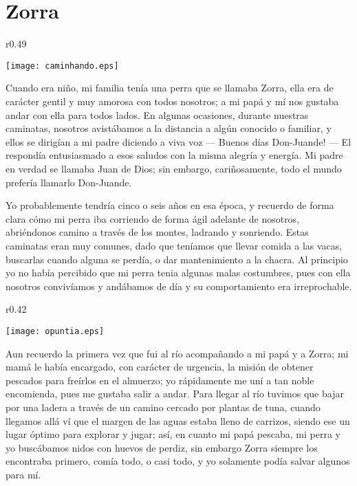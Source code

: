 \cleardoublepage
\newpage
{}
\chapter{Zorra}


\begin{wrapfigure}{r}{0.49\textwidth}
  \begin{center}
  \vspace{-30pt}
    \texttt{[image: caminhando.eps]}
  \end{center}
  \vspace{-20pt}
\end{wrapfigure}
Cuando era niño, mi familia tenía una perra que se llamaba Zorra, ella era de carácter gentil y muy amorosa con todos nosotros; a mi papá y mí nos gustaba andar con ella para todos lados. En algunas ocasiones, durante nuestras caminatas, nosotros avistábamos a la distancia  a algún conocido o familiar, y ellos se dirigían a mi padre diciendo a viva voz --- Buenos días Don-Juande! --- El respondía entusiasmado a esos saludos con la misma alegría y energía.
Mi padre en verdad se llamaba Juan de Dios; sin embargo, cariñosamente, todo el mundo prefería llamarlo Don-Juande.

Yo probablemente tendría cinco o seis años en esa época, y recuerdo de forma clara cómo mi perra iba corriendo de forma ágil adelante de nosotros, abriéndonos camino a través de los montes, ladrando y sonriendo.
Estas caminatas eran muy comunes, dado que teníamos que llevar comida a las vacas, buscarlas cuando alguna se perdía, o dar mantenimiento a la chacra.
Al principio yo no había percibido que mi perra tenia algunas malas costumbres, pues con ella nosotros convivíamos y andábamos de día y su comportamiento era irreprochable.

\begin{wrapfigure}{r}{0.42\textwidth}
  \begin{center}
  \vspace{-30pt}
    \texttt{[image: opuntia.eps]}
  \end{center}
  \vspace{-20pt}
\end{wrapfigure}
Aun recuerdo la primera vez que fui al río acompañando a mi papá y a Zorra; mi mamá le había encargado, con carácter de urgencia, la misión de obtener pescados para freírlos en el almuerzo; yo rápidamente me uní a tan noble encomienda, pues me gustaba salir a andar.
Para llegar al río tuvimos que bajar por una ladera a través de un camino cercado por plantas de tuna, cuando llegamos allá ví que el margen de las aguas estaba lleno de carrizos, siendo ese un lugar óptimo para explorar y jugar; así, en cuanto mi papá pescaba, mi perra y yo buscábamos nidos con huevos de perdiz, sin embargo Zorra siempre los encontraba primero, comía todo, o casi todo, y yo solamente podía salvar algunos para mí. 


